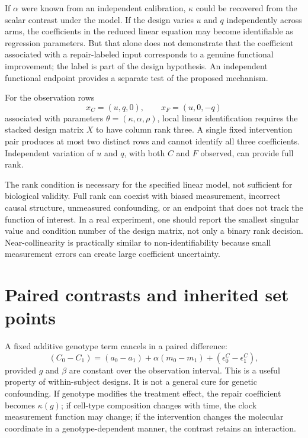 \documentclass[10pt,a4paper]{article}
\begin{document}
If \(\alpha\) were known from an independent calibration, \(\kappa\) could be recovered from the scalar contrast under the model. If the design varies \(u\) and \(q\) independently across arms, the coefficients in the reduced linear equation may become identifiable as regression parameters. But that alone does not demonstrate that the coefficient associated with a repair-labeled input corresponds to a genuine functional improvement; the label is part of the design hypothesis. An independent functional endpoint provides a separate test of the proposed mechanism.

\begin{tcolorbox}[colback=white,colframe=teal,title=Proposition 2 — rank condition for the local contrast model]
For the observation rows
\[
x_C=(u,q,0),\qquad x_F=(u,0,-q)
\]
associated with parameters \(\theta=(\kappa,\alpha,\rho)\), local linear identification requires the stacked design matrix \(X\) to have column rank three. A single fixed intervention pair produces at most two distinct rows and cannot identify all three coefficients. Independent variation of \(u\) and \(q\), with both \(C\) and \(F\) observed, can provide full rank.
\end{tcolorbox}

The rank condition is necessary for the specified linear model, not sufficient for biological validity. Full rank can coexist with biased measurement, incorrect causal structure, unmeasured confounding, or an endpoint that does not track the function of interest. In a real experiment, one should report the smallest singular value and condition number of the design matrix, not only a binary rank decision. Near-collinearity is practically similar to non-identifiability because small measurement errors can create large coefficient uncertainty.

\section{Paired contrasts and inherited set points}
A fixed additive genotype term cancels in a paired difference:
\[
(C_0-C_1)=(a_0-a_1)+\alpha(m_0-m_1)+(\epsilon^C_0-\epsilon^C_1),
\]
provided \(g\) and \(\beta\) are constant over the observation interval. This is a useful property of within-subject designs. It is not a general cure for genetic confounding. If genotype modifies the treatment effect, the repair coefficient becomes \(\kappa(g)\); if cell-type composition changes with time, the clock measurement function may change; if the intervention changes the molecular coordinate in a genotype-dependent manner, the contrast retains an interaction.
\end{document}
